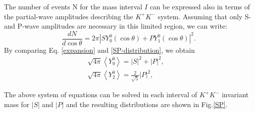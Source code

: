 {    The number of events N for the mass interval $I$ can be expressed also in terms of the partial-wave amplitudes describing the $K^{+}K^{-}$ system. Assuming that only S- and P-wave amplitudes are necessary in this limited region, we can write:
    \begin{equation}
        \frac{dN}{d\cos\theta} = 2\pi\left|SY_{0}^{0}(\cos\theta) + PY_{1}^{0}(\cos\theta)\right|^{2}.\label{SP-distribution}
    \end{equation}
    By comparing Eq. \ref{expansion} and \ref{SP-distribution}, we obtain 
    \begin{equation}
        \begin{array}{lr}
            \sqrt{4\pi}\left\langle Y_{0}^{0}\right\rangle = \left|S\right|^{2} + \left|P\right|^{2}, &\\ 
            \sqrt{4\pi}\left\langle Y_{2}^{0}\right\rangle = \frac{2}{\sqrt{5}}\left|P\right|^{2}, &
        \end{array}\label{SP-RES} 
    \end{equation}

}


\par{The above system of equations can be solved in each interval of $K^{+}K^{-}$ invariant mass for $\left|S\right|$ and $\left|P\right|$ and the resulting distributions are shown in Fig.\ref{SP}.  
}


